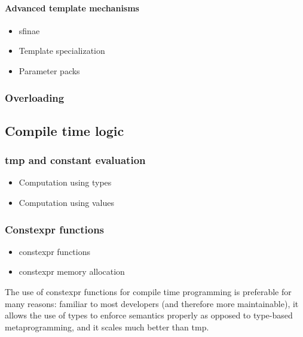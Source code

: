 \documentclass[../main]{subfiles}
\begin{document}
\paragraph{Advanced \cpp template mechanisms}

\begin{itemize}
\item \gls{sfinae}
\item Template specialization
\item Parameter packs
\end{itemize}

\subsubsection{
  Overloading
}

\subsection{
  Compile time logic
}

\subsubsection{
  \acrlong{tmp} and constant evaluation
}

\begin{itemize}
\item Computation using types
\item Computation using values
\end{itemize}

\subsubsection{
  Constexpr functions
}

\begin{itemize}
\item \gls{constexpr} functions
\item \gls{constexpr} memory allocation
\end{itemize}

The use of \gls{constexpr} functions for compile time programming is preferable
for many reasons: familiar to most \cpp developers (and therefore more
maintainable), it allows the use of types to enforce semantics properly
as opposed to type-based metaprogramming, and it scales much better than
\gls{tmp}.
\end{document}
